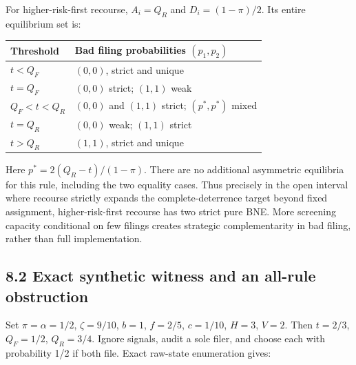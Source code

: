 \documentclass[
  11pt,
]{article}
\begin{document}
For higher-risk-first recourse, \(A_i=Q_R\) and \(D_i=(1-\pi)/2\). Its
entire equilibrium set is:

\begin{longtable}[]{@{}ll@{}}
\toprule\noalign{}
Threshold & Bad filing probabilities \((p_1,p_2)\) \\
\midrule\noalign{}
\endhead
\bottomrule\noalign{}
\endlastfoot
\(t<Q_F\) & \((0,0)\), strict and unique \\
\(t=Q_F\) & \((0,0)\) strict; \((1,1)\) weak \\
\(Q_F<t<Q_R\) & \((0,0)\) and \((1,1)\) strict; \((p^*,p^*)\) mixed \\
\(t=Q_R\) & \((0,0)\) weak; \((1,1)\) strict \\
\(t>Q_R\) & \((1,1)\), strict and unique \\
\end{longtable}

Here \(p^*=2(Q_R-t)/(1-\pi)\). There are no additional asymmetric
equilibria for this rule, including the two equality cases. Thus
precisely in the open interval where recourse strictly expands the
complete-deterrence target beyond fixed assignment, higher-risk-first
recourse has two strict pure BNE. More screening capacity conditional on
few filings creates strategic complementarity in bad filing, rather than
full implementation.

\subsection{8.2 Exact synthetic witness and an all-rule
obstruction}\label{exact-synthetic-witness-and-an-all-rule-obstruction}

Set \(\pi=\alpha=1/2\), \(\zeta=9/10\), \(b=1\), \(f=2/5\), \(c=1/10\),
\(H=3\), \(V=2\). Then \(t=2/3\), \(Q_F=1/2\), \(Q_R=3/4\). Ignore
signals, audit a sole filer, and choose each with probability 1/2 if
both file. Exact raw-state enumeration gives:
\end{document}
